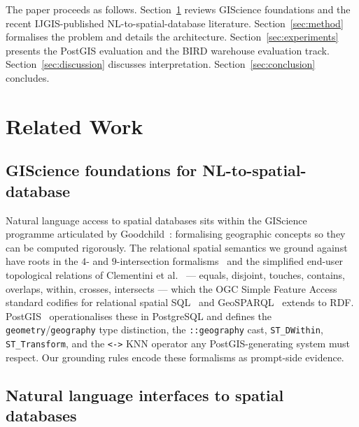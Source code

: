 \documentclass[11pt]{article}
\begin{document}
The paper proceeds as follows. Section~\ref{sec:related} reviews GIScience foundations and the recent IJGIS-published NL-to-spatial-database literature. Section~\ref{sec:method} formalises the problem and details the architecture. Section~\ref{sec:experiments} presents the PostGIS evaluation and the BIRD warehouse evaluation track. Section~\ref{sec:discussion} discusses interpretation. Section~\ref{sec:conclusion} concludes.

\section{Related Work}
\label{sec:related}

\subsection{GIScience foundations for NL-to-spatial-database}

Natural language access to spatial databases sits within the GIScience programme articulated by Goodchild~\cite{goodchild1992gis}: formalising geographic concepts so they can be computed rigorously. The relational spatial semantics we ground against have roots in the $4$- and $9$-intersection formalisms~\cite{egenhofer1991topological} and the simplified end-user topological relations of Clementini et al.~\cite{clementini1993small} --- equals, disjoint, touches, contains, overlaps, within, crosses, intersects --- which the OGC Simple Feature Access standard codifies for relational spatial SQL~\cite{ogcsfs} and GeoSPARQL~\cite{ogcgeosparql} extends to RDF. PostGIS~\cite{postgis} operationalises these in PostgreSQL and defines the \texttt{geometry}/\texttt{geography} type distinction, the \texttt{::geography} cast, \texttt{ST\_DWithin}, \texttt{ST\_Transform}, and the \texttt{<->} KNN operator any PostGIS-generating system must respect. Our grounding rules encode these formalisms as prompt-side evidence.

\subsection{Natural language interfaces to spatial databases}
\end{document}
